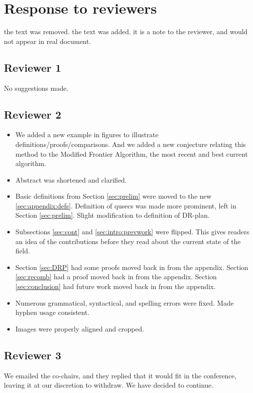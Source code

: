 \section{Response to reviewers}

 the text was removed.
 the text was added.
 it is a note to the reviewer, and would not appear in real document.

\subsection{Reviewer 1}
No suggestions made.

\subsection{Reviewer 2}
\begin{itemize}
  \item We added a new example in figures to illustrate definitions/proofs/comparisons. And we added a new conjecture relating this method to the Modified Frontier Algorithm, the most recent and best current algorithm.
  \item Abstract was shortened and clarified.
  \item Basic definitions from Section \ref{sec:prelim} were moved to the new \ref{sec:appendix:defs}. Definition of qusecs was made more prominent, left in Section \ref{sec:prelim}. Slight modification to definition of DR-plan.
  \item Subsections \ref{sec:cont} and \ref{sec:intro:prevwork} were flipped. This gives readers an idea of the contributions before they read about the current state of the field.
  \item Section \ref{sec:DRP} had some proofs moved back in from the appendix. Section \ref{sec:recomb} had a proof moved back in from the appendix. Section \ref{sec:conclusion} had future work moved back in from the appendix.
  \item Numerous grammatical, syntactical, and spelling errors were fixed. Made hyphen usage consistent.
  \item Images were properly aligned and cropped.
\end{itemize}

\subsection{Reviewer 3}
We emailed the co-chairs, and they replied that it would fit in the conference, leaving it at our discretion to withdraw. We have decided to continue.




